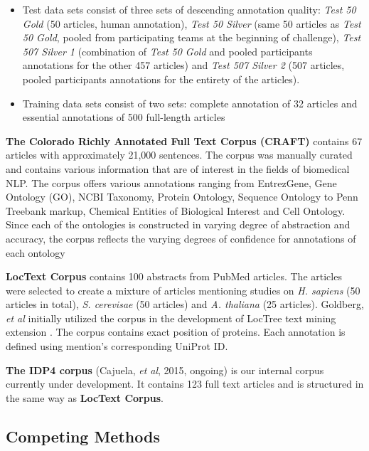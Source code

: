 \begin{itemize}
\item Test data sets consist of three sets of descending annotation quality: \textit{Test 50 Gold} (50 articles, human annotation), \textit{Test 50 Silver} (same 50 articles as \textit{Test 50 Gold}, pooled from participating teams at the beginning of challenge), \textit{Test 507 Silver 1} (combination of \textit{Test 50 Gold} and pooled participants annotations for the other 457 articles) and \textit{Test 507 Silver 2} (507 articles, pooled participants annotations for the entirety of the articles).

\item Training data sets consist of two sets: complete annotation of 32 articles and essential annotations of 500 full-length articles
\end{itemize} 


\textbf{The Colorado Richly Annotated Full Text Corpus (CRAFT)} \citep{verspoor2012corpus} \citep{bada2012concept} contains 67 articles with approximately 21,000 sentences. The corpus was manually curated and contains various information that are of interest in the fields of biomedical NLP. The corpus offers various annotations ranging from EntrezGene, Gene Ontology (GO), NCBI Taxonomy, Protein Ontology, Sequence Ontology to Penn Treebank markup, Chemical Entities of Biological Interest and Cell Ontology. Since each of the ontologies is constructed in varying degree of abstraction and accuracy, the corpus reflects the varying degrees of confidence for annotations of each ontology \citep{bada2012concept}

\textbf{LocText Corpus} \citep{goldberg2015linked} contains 100 abstracts from PubMed articles. The articles were selected to create a mixture of articles mentioning studies on \textit{H. sapiens} (50 articles in total), \textit{S. cerevisae} (50 articles) and \textit{A. thaliana} (25 articles). Goldberg, \textit{et al} initially utilized the corpus in the development of LocTree text mining extension \citep{goldberg2012loctree2}. The corpus contains exact position of proteins. Each annotation is defined using mention's corresponding UniProt ID.

\textbf{The IDP4 corpus} (Cajuela, \textit{et al}, 2015, ongoing) is our internal corpus currently under development. It contains 123 full text articles and is structured in the same way as \textbf{LocText Corpus}.

\subsection{Competing Methods}


